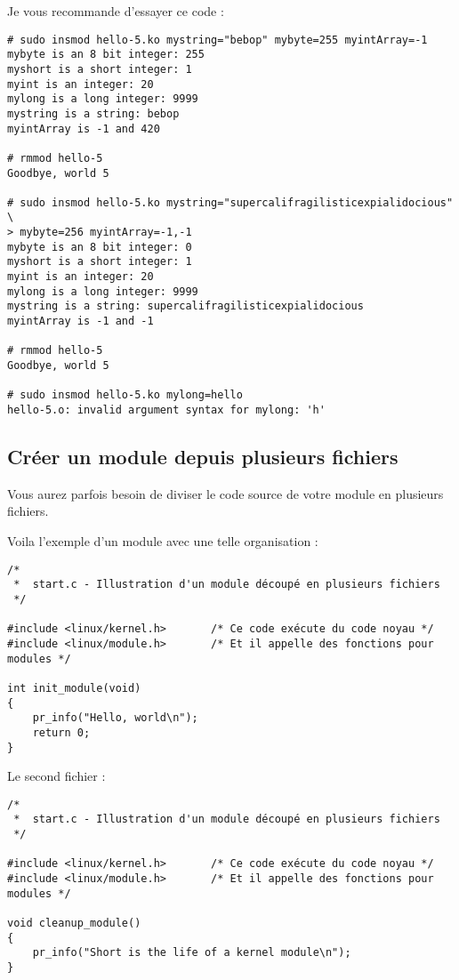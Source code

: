 \documentclass[11pt]{article}
\begin{document}
Je vous recommande d'essayer ce code :

\begin{verbatim}
# sudo insmod hello-5.ko mystring="bebop" mybyte=255 myintArray=-1
mybyte is an 8 bit integer: 255
myshort is a short integer: 1
myint is an integer: 20
mylong is a long integer: 9999
mystring is a string: bebop
myintArray is -1 and 420

# rmmod hello-5
Goodbye, world 5

# sudo insmod hello-5.ko mystring="supercalifragilisticexpialidocious" \
> mybyte=256 myintArray=-1,-1
mybyte is an 8 bit integer: 0
myshort is a short integer: 1
myint is an integer: 20
mylong is a long integer: 9999
mystring is a string: supercalifragilisticexpialidocious
myintArray is -1 and -1

# rmmod hello-5
Goodbye, world 5

# sudo insmod hello-5.ko mylong=hello
hello-5.o: invalid argument syntax for mylong: 'h'
\end{verbatim}

\subsection*{Créer un module depuis plusieurs fichiers}
\label{sec-4-6}

Vous aurez parfois besoin de diviser le code source de votre module en plusieurs fichiers.

Voila l'exemple d'un module avec une telle organisation :

\begin{verbatim}
/*
 *  start.c - Illustration d'un module découpé en plusieurs fichiers
 */

#include <linux/kernel.h>       /* Ce code exécute du code noyau */
#include <linux/module.h>       /* Et il appelle des fonctions pour modules */

int init_module(void)
{
    pr_info("Hello, world\n");
    return 0;
}
\end{verbatim}

Le second fichier :

\begin{verbatim}
/*
 *  start.c - Illustration d'un module découpé en plusieurs fichiers
 */

#include <linux/kernel.h>       /* Ce code exécute du code noyau */
#include <linux/module.h>       /* Et il appelle des fonctions pour modules */

void cleanup_module()
{
    pr_info("Short is the life of a kernel module\n");
}
\end{verbatim}
\end{document}
